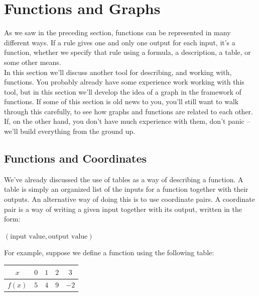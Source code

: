 %
%
\section{Functions and Graphs}
\label{FunctionsandGraphs}

As we saw in the preceding section, functions can be represented in many different ways. If a rule gives one and only one output for each input, it’s a function, whether we specify that rule using a formula, a description, a table, or some other means.\\

In this section we’ll discuss another tool for describing, and working with, functions. You probably already have some experience work working with this tool, but in this section we’ll develop the idea of a graph in the framework of functions. If some of this section is old news to you, you’ll still want to walk through this carefully, to see how graphs and functions are related to each other. If, on the other hand, you don’t have much experience with them, don’t panic – we’ll build everything from the ground up.

%
%

\subsection{Functions and Coordinates}

We’ve already discussed the use of tables as a way of describing a function. A table is simply an organized list of the inputs for a function together with their outputs. An alternative way of doing this is to use coordinate pairs. A coordinate pair is a way of writing a given input together with its output, written in the form:

\begin{center}
	$(\text{input value}, \text{output value})$
\end{center}

For example, suppose we define a function using the following table:

\begin{center}
	\begin{tabular}{c|c|c|c|c}
		$x$ & $0$ & $1$ & $2$ & $3$\\
		\hline
		$f(x)$ & $5$ & $4$ & $9$ & $-2$ 
	\end{tabular}
\end{center}

